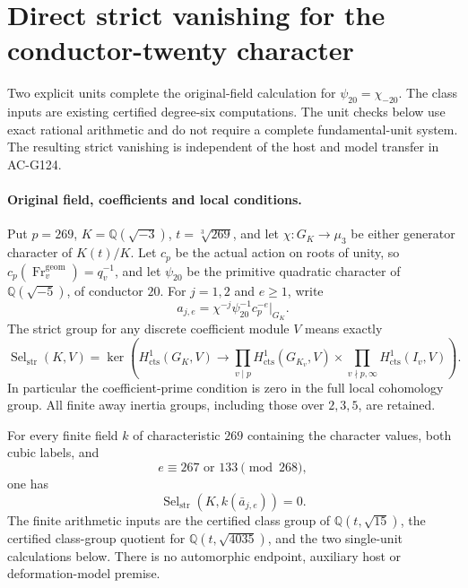 \section{Direct strict vanishing for the conductor-twenty character}
\label{sec:cubic-psi20-strict-vanishing}

Two explicit units complete the original-field calculation for
\(\psi_{20}=\chi_{-20}\).  The class inputs are existing certified
degree-six computations.  The unit checks below use exact rational
arithmetic and do not require a complete fundamental-unit system.
The resulting strict vanishing is independent of the host and
model transfer in AC-G124.

\paragraph{Original field, coefficients and local conditions.}
Put \(p=269\), \(K=\mathbb Q(\sqrt{-3})\), \(t=\sqrt[3]{269}\),
and let \(\chi:G_K\to\mu_3\) be either generator character of
\(K(t)/K\).  Let \(c_p\) be the actual action on roots of unity,
so \(c_p(\operatorname{Fr}^{\mathrm{geom}}_v)=q_v^{-1}\), and
let \(\psi_{20}\) be the primitive quadratic character of
\(\mathbb Q(\sqrt{-5})\), of conductor \(20\).
For \(j=1,2\) and \(e\ge1\), write
\[
                 a_{j,e}=\chi^{-j}\psi_{20}^{-1}c_p^{-e}|_{G_K}.
 \tag{G126.1}
\]
The strict group for any discrete coefficient module \(V\) means
exactly
\[
 \operatorname{Sel}_{\mathrm{str}}(K,V)
  =\ker\left(H^1_{\mathrm{cts}}(G_K,V)\longrightarrow
     \prod_{v\mid p}H^1_{\mathrm{cts}}(G_{K_v},V)
       \times\prod_{v\nmid p,\infty}H^1_{\mathrm{cts}}(I_v,V)\right).
 \tag{G126.2}
\]
In particular the coefficient-prime condition is zero in the
full local cohomology group.  All finite away inertia groups,
including those over \(2,3,5\), are retained.

\begin{theorem}
\label{AC-G126-residual}
For every finite field \(k\) of characteristic \(269\) containing
the character values, both cubic labels, and
\[
                         e\equiv267\text{ or }133\pmod {268},
 \tag{G126.3}
\]
one has
\[
              \operatorname{Sel}_{\mathrm{str}}
                      (K,k(\bar a_{j,e}))=0.
 \tag{G126.4}
\]
The finite arithmetic inputs are the certified class group
of \(\mathbb Q(t,\sqrt{15})\), the certified class-group
quotient for \(\mathbb Q(t,\sqrt{4035})\), and the two
single-unit calculations below.  There is no automorphic
endpoint, auxiliary host or deformation-model premise.
\end{theorem}

